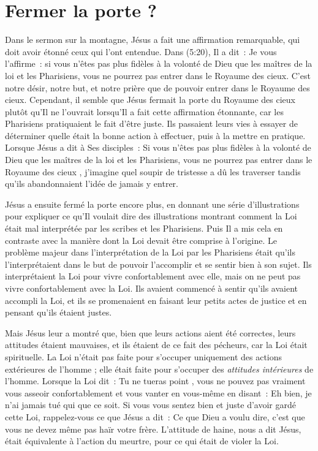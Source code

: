 \section{Fermer la porte ?}

Dans le sermon sur la montagne, Jésus a fait une affirmation remarquable,
 qui doit avoir étonné ceux qui l'ont entendue.
 Dans (5:20), Il a dit~:
 \og Je vous l'affirme~:
 si vous n'êtes pas plus fidèles à la volonté de Dieu
 que les maîtres de la loi et les Pharisiens,
 vous ne pourrez pas entrer dans le Royaume des cieux. \fg{}
 C'est notre désir, notre but, et notre prière que de pouvoir entrer
 dans le Royaume des cieux.
 Cependant, il semble que Jésus fermait la porte du Royaume des cieux
 plutôt qu'Il ne l'ouvrait lorsqu'Il a fait cette affirmation étonnante,
 car les Pharisiens pratiquaient le fait d'être juste.
 Ils passaient leurs vies à essayer de déterminer quelle était
 la bonne action à effectuer,
 puis à la mettre en pratique.
 Lorsque Jésus a dit à Ses disciples~:
 \og Si vous n'êtes pas plus fidèles à la volonté de Dieu que
 les maîtres de la loi et les Pharisiens, vous ne pourrez pas
 entrer dans le Royaume des cieux \fg{}, j'imagine quel soupir de tristesse
 a dû les traverser tandis qu'ils abandonnaient
 l'idée de jamais y entrer.

Jésus a ensuite fermé la porte encore plus,
 en donnant une série d'illustrations pour expliquer
 ce qu'Il voulait dire \ocadr des illustrations montrant comment la Loi
 était mal interprétée par les scribes et les Pharisiens.
 Puis Il a mis cela en contraste avec la manière dont la Loi
 devait être comprise à l'origine.
 Le problème majeur dans l'interpré\-ta\-tion de la Loi par les Pharisiens
 était qu'ils l'interprétaient dans le but de pouvoir l'accomplir
 et se sentir bien à son sujet.
 Ils interprétaient la Loi pour vivre confortablement avec elle,
 mais on ne peut pas vivre confortablement avec la Loi.
 Ils avaient commencé à sentir qu'ils avaient accompli la Loi,
 et ils se promenaient en faisant leur petits actes de justice
 et en pensant qu'ils étaient justes.

Mais Jésus leur a montré que, bien que leurs actions
 aient été correctes, leurs attitudes étaient mauvaises,
 et ils étaient de ce fait des pécheurs,
 car la Loi était spirituelle.
 La Loi n'était pas faite pour s'occuper uniquement des actions extérieures
 de l'homme ; elle était faite pour s'occuper
 des \emph{attitudes intérieures} de l'homme.
 Lorsque la Loi dit~: \og Tu ne tueras point \fg{},
 vous ne pouvez pas vraiment vous asseoir confortablement et vous vanter
 en vous-même en disant~:
 \og Eh bien, je n'ai jamais tué qui que ce soit. \fg{}
 Si vous vous sentez bien et juste d'avoir gardé cette Loi,
 rappelez-vous ce que Jésus a dit~:
 \og Ce que Dieu a voulu dire, c'est que vous ne devez même pas
 haïr votre frère. \fg{}
 L'attitude de haine, nous a dit Jésus,
 était équivalente à l'action du meurtre,
 pour ce qui était de violer la Loi.

